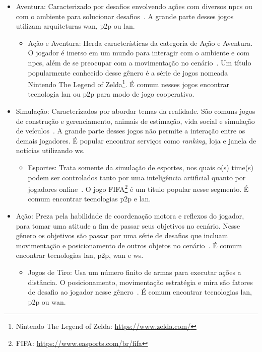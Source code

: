 \begin{itemize}
\begin{itemize}
    \end{itemize}
  \item Aventura: Caracterizado por desafios envolvendo ações com diversos \ac{npcs} ou com o ambiente para solucionar desafios~\cite{adams_1208533}. A grande parte desses jogos utilizam arquiteturas \ac{wan}, \ac{p2p} ou \ac{lan}.
    \begin{itemize}
      \item Ação e Aventura: Herda características da categoria de Ação e Aventura. O jogador é imerso em um mundo para interagir com o ambiente e com \ac{npcs}, além de se preocupar com a movimentação no cenário~\cite{adams_1208533}. Um título popularmente conhecido desse gênero é a série de jogos nomeada Nintendo The Legend of Zelda\footnote{Nintendo The Legend of Zelda: \url{https://www.zelda.com/}}. É comum nesses jogos encontrar tecnologia \ac{lan} ou \ac{p2p} para modo de jogo cooperativo.
    \end{itemize}
  \item Simulação: Caracterizados por abordar temas da realidade. São comuns jogos de construção e gerenciamento, animais de estimação, vida social e simulação de veículos~\cite{adams_1208533}. A grande parte desses jogos não permite a interação entre os demais jogadores. É popular encontrar serviços como \textit{ranking}, loja e janela de notícias utilizando \ac{ws}.
    \begin{itemize}
      \item Esportes: Trata somente da simulação de esportes, nos quais o(s) time(s) podem ser controlados tanto por uma inteligência artificial quanto por jogadores online~\cite{adams_1208533}. O jogo FIFA\footnote{FIFA: \url{https://www.easports.com/br/fifa}} é um título popular nesse segmento. É comum encontrar tecnologias \ac{p2p} e \ac{lan}.
    \end{itemize}
  \item Ação: Preza pela habilidade de coordenação motora e reflexos do jogador, para tomar uma atitude a fim de passar seus objetivos no cenário. Nesse gênero os objetivos são passar por uma série de desafios que incluam movimentação e posicionamento de outros objetos no cenário~\cite{adams_1208533}. É comum encontrar tecnologias \ac{lan}, \ac{p2p}, \ac{wan} e \ac{ws}.
    \begin{itemize}
      \item Jogos de Tiro: Usa um número finito de armas para executar ações a distância. O posicionamento, movimentação estratégia e mira são fatores de desafio ao jogador nesse gênero~\cite{adams_1208533}. É comum encontrar tecnologias \ac{lan}, \ac{p2p} ou \ac{wan}.

\end{itemize}
\end{itemize}
